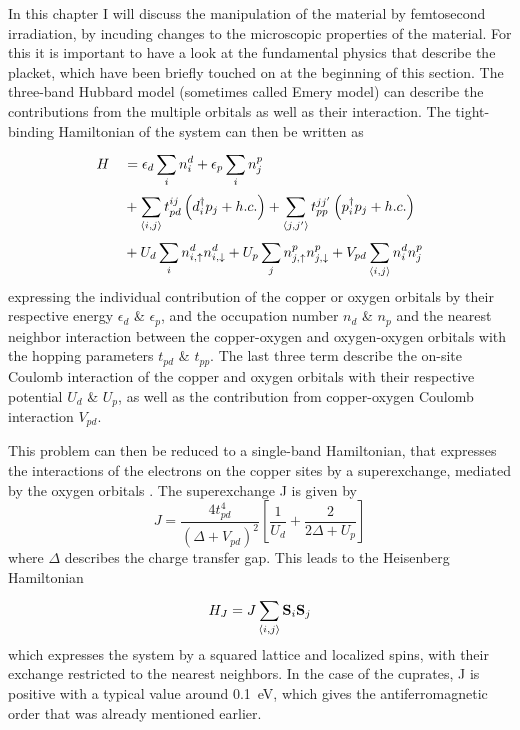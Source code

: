 In this chapter I will discuss the manipulation of the material by femtosecond irradiation, by incuding changes to the microscopic properties of the material.
For this it is important to have a look at the fundamental physics that describe the  placket, which have been briefly touched on at the beginning of this section.
The three-band Hubbard model (sometimes called Emery model) can describe the contributions from the multiple orbitals as well as their interaction\cite{avella_emery_2013,emery_theory_1987,ogata_tj_2008}.
The tight-binding Hamiltonian of the system can then be written as
\begin{equation}
\begin{split}
	H &\quad = \epsilon_d \sum_{i}^{} n_i^d + \epsilon_p \sum_{i}^{} n_j^p \\
	  &\quad + \sum_{\braket{i,j}}^{} t_{pd}^{ij} \left(d_i^\dagger p_j + h.c.\right) + \sum_{\braket{j,j'}}^{} t_{pp}^{jj'} \left(p_i^\dagger p_j + h.c.\right)\\
	  &\quad + U_d \sum_{i}^{} n_{i,\uparrow}^d n_{i,\downarrow}^d + U_p \sum_{j}^{} n_{j,\uparrow}^p n_{j,\downarrow}^p + V_{pd} \sum_{\braket{i,j}}^{} n_i^d n_j^p
\end{split}
\end{equation}
expressing the individual contribution of the copper or oxygen orbitals by their respective energy $\epsilon_d$ \& $\epsilon_p$, and the occupation number $n_d$ \& $n_p$ and the nearest neighbor interaction between the copper-oxygen and oxygen-oxygen orbitals with the hopping parameters $t_{pd}$ \& $t_{pp}$.
The last three term describe the on-site Coulomb interaction of the copper and oxygen orbitals with their respective potential $U_d$ \& $U_p$, as well as the contribution from copper-oxygen Coulomb interaction $V_{pd}$.

This problem can then be reduced to a single-band Hamiltonian, that expresses the interactions of the electrons on the copper sites by a superexchange, mediated by the oxygen orbitals \cite{anderson_new_1959,zhang_effective_1988,emery_mechanism_1988}.
The superexchange J is given by
\begin{equation}
	J= \frac{4t_{pd}^4}{\left(\Delta + V_{pd} \right)^2} \left[\frac{1}{U_d} + \frac{2}{2\Delta + U_p}\right]
\end{equation}
where $\Delta$ describes the charge transfer gap.
This leads to the Heisenberg Hamiltonian
\begin{equation}
	H_J = J \sum_{\braket{i,j}}^{} \mathbf{S}_i \mathbf{S}_j
\end{equation}
which expresses the system by a squared lattice and localized spins, with their exchange restricted to the nearest neighbors.
In the case of the cuprates, J is positive with a typical value around \qty{0.1}{\electronvolt}, which gives the antiferromagnetic order that was already mentioned earlier.

